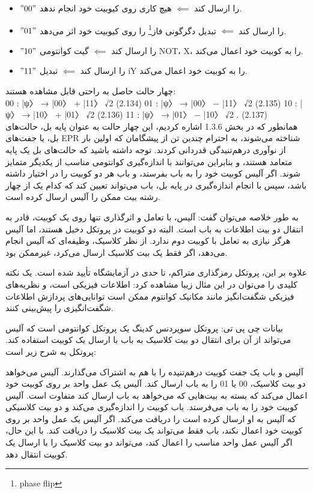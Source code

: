 \documentclass{book}
\begin{document}
\begin{itemize}
	\item  $"00"$ را ارسال کند $\impliedby$ هیچ کاری روی کیوبیت خود انجام ندهد.
	\item $"01"$ را ارسال کند $\impliedby$ تبدیل دگرگونی فاز\footnote{phase flip} را روی کیوبیت خود اثر می‌دهد.
	\item  $"10"$ را ارسال کند $\impliedby$ گیت کوانتومی NOT، X، را به کوبیت خود اعمال می‌کند.
	\item  $"11"$ را ارسال کند $\impliedby$ تبدیل iY را به کوبیت خود اعمال می‌کند.
\end{itemize}
چهار حالت حاصل به راحتی قابل مشاهده هستند:\\
00 : |ψ〉 → |00〉 + |11〉
√2 (2.134)
01 : |ψ〉 → |00〉 − |11〉
√2 (2.135)
10 : |ψ〉 → |10〉 + |01〉
√2 (2.136)
11 : |ψ〉 → |01〉 − |10〉
√2 . (2.137)\\


همانطور که در بخش 1.3.6 اشاره کردیم، این چهار حالت به عنوان پایه بل، حالت‌های بل، یا جفت‌های EPR شناخته می‌شوند، به احترام چندین تن از پیشگامان که اولین بار از نوآوری درهم‌تنیدگی قدردانی کردند. توجه داشته باشید که حالت‌های بل یک پایه متعامد هستند، و بنابراین می‌توانند با اندازه‌گیری کوانتومی مناسب از یکدیگر متمایز شوند. اگر آلیس کوبیت خود را به باب بفرستد، و باب هر دو کوبیت را در اختیار داشته باشد، سپس با انجام اندازه‌گیری در پایه بل، باب می‌تواند تعیین کند که کدام یک از چهار رشته بیت ممکن را آلیس ارسال کرده است.

به طور خلاصه می‌توان گفت:
 آلیس، با تعامل و اثرگذاری تنها روی یک کوبیت، قادر به انتقال دو بیت اطلاعات به باب است. البته دو کوبیت در پروتکل دخیل هستند، اما آلیس هرگز نیازی به تعامل با کوبیت دوم ندارد. از نظر کلاسیک، وظیفه‌ای که آلیس انجام می‌دهد، اگر فقط یک بیت کلاسیک ارسال می‌کرد، غیرممکن بود.

علاوه بر این، پروتکل رمزگذاری متراکم، تا حدی در آزمایشگاه تأیید شده است.  یک نکته کلیدی را می‌توان در این مثال زیبا مشاهده کرد: اطلاعات فیزیکی است، و نظریه‌های فیزیکی شگفت‌انگیز مانند مکانیک کوانتوم ممکن است توانایی‌های پردازش اطلاعات شگفت‌انگیزی را پیش‌بینی کنند.



بیانات چی پی تی:
پروتکل سوپردنس کدینگ یک پروتکل کوانتومی است که آلیس می‌تواند از آن برای انتقال دو بیت کلاسیک به باب با ارسال یک کوبیت استفاده کند. پروتکل به شرح زیر است:

آلیس و باب یک جفت کوبیت درهم‌تنیده را با هم به اشتراک می‌گذارند.
آلیس می‌خواهد دو بیت کلاسیک، 00 یا 01 را به باب ارسال کند.
آلیس یک عمل واحد بر روی کوبیت خود اعمال می‌کند که بسته به بیت‌هایی که می‌خواهد به باب ارسال کند متفاوت است.
آلیس کوبیت خود را به باب می‌فرستد.
باب کوبیت را اندازه‌گیری می‌کند و دو بیت کلاسیکی که آلیس به او ارسال کرده است را دریافت می‌کند.
اگر آلیس یک عمل واحد بر روی کوبیت خود اعمال نکند، باب فقط می‌تواند یک بیت کلاسیک را دریافت کند. با این حال، اگر آلیس عمل واحد مناسب را اعمال کند، می‌تواند دو بیت کلاسیک را با ارسال یک کوبیت انتقال دهد.
\end{document}
